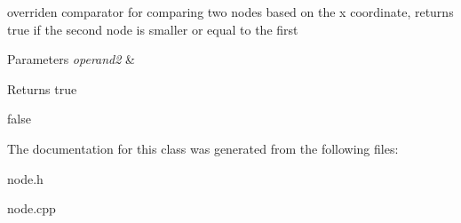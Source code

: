 overriden comparator for comparing two nodes based on the x coordinate, returns true if the second node is smaller or equal to the first 


\begin{DoxyParams}{Parameters}
{\em operand2} & \\
\hline
\end{DoxyParams}
\begin{DoxyReturn}{Returns}
true 

false 
\end{DoxyReturn}


The documentation for this class was generated from the following files\+:\begin{DoxyCompactItemize}
\item 
node.\+h\item 
node.\+cpp\end{DoxyCompactItemize}
